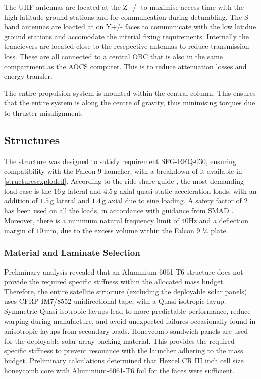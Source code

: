 \documentclass[a4paper, 11pt, conference]{IEEEtran}
\begin{document}
The UHF antennas are located at the Z+/- to maximise access time with the high latitude ground stations and for communcation during detumbling. The S-band antennas are loacted at on Y+/- faces to communicate with the low latidue ground stations and accomodate the interial fixing requirements. Internally the trancievers are located close to the resepective antennas to reduce transmission loss. These are all connected to a central OBC that is also in the same compartment as the AOCS computer. This is to reduce attenuation losses and energy transfer.


The entire propulsion system is mounted within the central column. This ensures that the entire system is along the centre of gravity, thus minimising torques due to thruster misalignment. 

\subsection{Structures}

The structure was designed to satisfy requirement SFG-REQ-030, ensuring compatibility with the Falcon 9 launcher, with a breakdown of it available in \autoref{structuresexploded}. According to the ride-share guide \cite{noauthor_falcon9rideshare_2024}, the most demanding load case is the $16\,\mathrm{g}$ lateral and $4.5\,\mathrm{g}$ axial quasi-static acceleration loads, with an addition of $1.5\,\mathrm{g}$ lateral and $1.4\,\mathrm{g}$ axial due to sine loading. A safety factor of 2 has been used on all the loads, in accordance with guidance from SMAD \cite{wertz_space_1999}. Moreover, there is a minimum natural frequency limit of $40\mathrm{Hz}$ and a deflection margin of $10\,\mathrm{mm}$, due to the excess volume within the Falcon 9 ¼ plate.

\subsubsection{Material and Laminate Selection}

Preliminary analysis revealed that an Aluminium-6061-T6 structure does not provide the required specific stiffness within the allocated mass budget. Therefore, the entire satellite structure (excluding the deployable solar panels) uses CFRP IM7/8552 \cite{IM7/8552} unidirectional tape, with a Quasi-isotropic layup. Symmetric Quasi-isotropic layups lead to more predictable performance, reduce warping during manufacture, and avoid unexpected failures occasionally found in anisotropic layups from secondary loads. Honeycomb sandwich panels are used for the deployable solar array backing material. This provides the required specific stiffness to prevent resonance with the launcher adhering to the mass budget. Preliminary calculations determined that Hexcel CR III  inch cell size honeycomb core \cite{hexwebcr3} with Aluminium-6061-T6 \cite{Al-6061-T6} foil for the faces were sufficient. 
\end{document}
